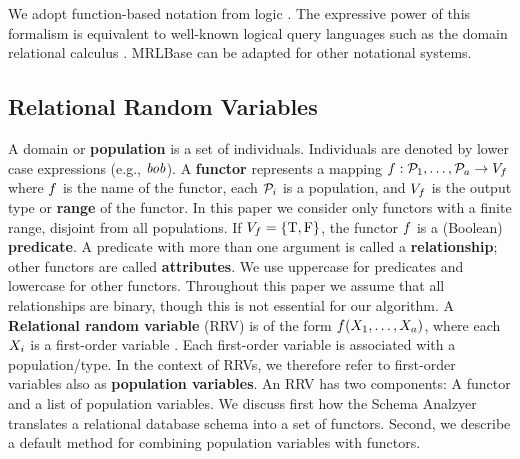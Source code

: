 \documentclass{acm_proc_article-sp}
\begin{document}

We adopt function-based notation from logic  \cite{Russell2010}. The expressive power of this formalism is equivalent to well-known logical query languages such as the domain relational calculus \cite{Ullman1982}. MRLBase can be adapted for other notational systems.

\subsection{Relational Random Variables}
A domain or \textbf{population} is a set of individuals.
Individuals are denoted by lower case expressions (e.g., $\it{bob}$). 
A \textbf{functor} represents a mapping
$f: \mathcal{P}_{1},\ldots,\mathcal{P}_{a} \rightarrow V_{f}$
where $f$ is the name of the functor, each $\mathcal{P}_{i}$ is a population, and $V_{f}$ is the output type or \textbf{range} of the functor. 
In this paper we consider only functors with a finite range, disjoint from all populations.  If $V_{f} = \{\mathrm{T},\mathrm{F}\}$, the functor $f$ is a (Boolean) \textbf{predicate}. A predicate with more than one argument is called a \textbf{relationship}; other functors are called \textbf{attributes}. We use uppercase for predicates and lowercase for other functors. Throughout this paper we assume that all relationships are binary, though this is not essential for our algorithm.
%
A \textbf{Relational random variable} (RRV) is of the form $f(X_{1},\ldots,X_{a})$, where each $X_{i}$ is a first-order variable \cite{Poole2003,Russell2010}. 
Each first-order variable is associated with a population/type. In the context of RRVs, we therefore refer to first-order variables also as \textbf{population variables}. An RRV has two components: A functor and a list of population variables. We discuss first how the Schema Analzyer translates a relational database schema into a set of functors. Second, we describe a default method for combining population variables with functors. 
\end{document}
